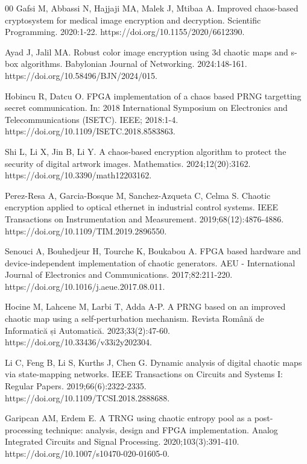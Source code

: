 \documentclass[preprint,12pt]{elsarticle}
\begin{document}
\begin{thebibliography}{00}
Gafsi M, Abbassi N, Hajjaji MA, Malek J, Mtibaa A. Improved chaos-based cryptosystem for medical image encryption and decryption. Scientific Programming. 2020:1-22. https://doi.org/10.1155/2020/6612390.

Ayad J, Jalil MA. Robust color image encryption using 3d chaotic maps and s-box algorithms. Babylonian Journal of Networking. 2024:148-161. https://doi.org/10.58496/BJN/2024/015.

Hobincu R, Datcu O. FPGA implementation of a chaos based PRNG targetting secret communication. In: 2018 International Symposium on Electronics and Telecommunications (ISETC). IEEE; 2018:1-4. https://doi.org/10.1109/ISETC.2018.8583863.

Shi L, Li X, Jin B, Li Y. A chaos-based encryption algorithm to protect the security of digital artwork images. Mathematics. 2024;12(20):3162. https://doi.org/10.3390/math12203162.

Perez-Resa A, Garcia-Bosque M, Sanchez-Azqueta C, Celma S. Chaotic encryption applied to optical ethernet in industrial control systems. IEEE Transactions on Instrumentation and Measurement. 2019;68(12):4876-4886. https://doi.org/10.1109/TIM.2019.2896550.

Senouci A, Bouhedjeur H, Tourche K, Boukabou A. FPGA based hardware and device-independent implementation of chaotic generators. AEU - International Journal of Electronics and Communications. 2017;82:211-220. https://doi.org/10.1016/j.aeue.2017.08.011.

Hocine M, Lahcene M, Larbi T, Adda A-P. A PRNG based on an improved chaotic map using a self-perturbation mechanism. Revista Română de Informatică și Automatică. 2023;33(2):47-60. https://doi.org/10.33436/v33i2y202304.

Li C, Feng B, Li S, Kurths J, Chen G. Dynamic analysis of digital chaotic maps via state-mapping networks. IEEE Transactions on Circuits and Systems I: Regular Papers. 2019;66(6):2322-2335. https://doi.org/10.1109/TCSI.2018.2888688.

Garipcan AM, Erdem E. A TRNG using chaotic entropy pool as a post-processing technique: analysis, design and FPGA implementation. Analog Integrated Circuits and Signal Processing. 2020;103(3):391-410. https://doi.org/10.1007/s10470-020-01605-0.


\end{thebibliography}
\end{document}
